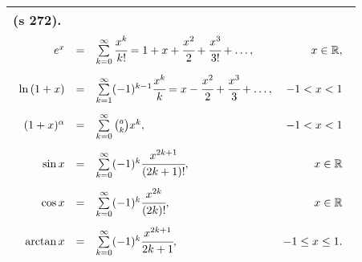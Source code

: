 \documentclass[a4paper]{article}
\begin{document}
\begin{tabular}{|L{11.5cm}|} \hline
(s 272).
\begin{equation*}
\begin{array}{rllr}
\vspace{0.3cm}
e^x&=& \sum\limits_{k=0}^{\infty}\cfrac{x^k}{k!} = 1+x+\cfrac{x^2}{2}+\cfrac{x^3}{3!}+\ldots, &x \in \mathbb{R}, \\\vspace{0.3cm}
\ln{(1+x)}&=&\sum\limits_{k=1}^{\infty}(-1)^{k-1}\cfrac{x^k}{k}=x-\cfrac{x^2}{2}+\cfrac{x^3}{3}+\ldots, & -1<x<1\\\vspace{0.3cm}
(1+x)^\alpha&=&\sum\limits_{k=0}^{\infty}\tbinom{a}{k}x^k, & -1<x<1\\\vspace{0.3cm}
\sin x&=&\sum\limits_{k=0}^{\infty}(-1)^k 
\cfrac{x^{2k+1}}{(2k+1)!}, & x\in \mathbb{R}\\\vspace{0.3cm}
\cos x&=&\sum\limits_{k=0}^{\infty}(-1)^{k}\cfrac{x^{2k}}{(2k)!}, & x\in \mathbb{R}\\\vspace{0.3cm}
\arctan x&=&\sum\limits_{k=0}^{\infty}(-1)^k 
\cfrac{x^{2k+1}}{2k+1}, & -1 \leq x \leq 1.
\end{array}
\end{equation*}
\\\hline
\end{tabular}
\newpage
\end{document}
